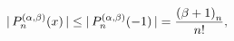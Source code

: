 \[|\mathop{P^{(\alpha,\beta)}_{n}\/}\nolimits\!\left(x\right)|\leq|\mathop{P^{(%
\alpha,\beta)}_{n}\/}\nolimits\!\left(-1\right)|=\frac{\left(\beta+1\right)_{n%
}}{n!},\]